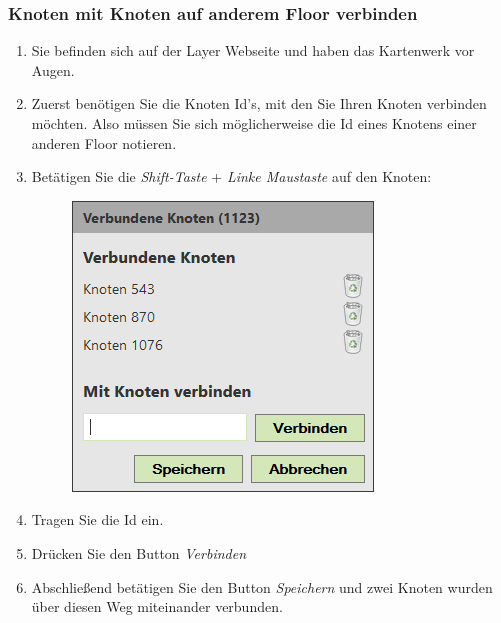 \subsubsection*{Knoten mit Knoten auf anderem Floor verbinden}
\label{Knoten mit Knoten auf anderem Floor verbinden}
\begin{enumerate}
\item Sie befinden sich auf der Layer Webseite und haben das Kartenwerk vor Augen.
\item Zuerst benötigen Sie die Knoten Id's, mit den Sie Ihren Knoten verbinden möchten. Also müssen Sie sich möglicherweise die Id eines Knotens einer anderen Floor notieren.
\item Betätigen Sie die \textit{Shift-Taste} + \textit{Linke Maustaste} auf den Knoten:
		\begin{figure}[H]
		\centering
		\includegraphics[width=0.3\linewidth]{../Bilder/Admin/AnleitungKnotenMiteinanderVerbinden}
		\label{fig:AnleitungKnotenMiteinanderVerbinden}
		\end{figure}
\item Tragen Sie die Id ein.
\item Drücken Sie den Button \textit{Verbinden}
\item Abschließend betätigen Sie den Button \textit{Speichern} und zwei Knoten wurden über diesen Weg miteinander verbunden.
\end{enumerate}

